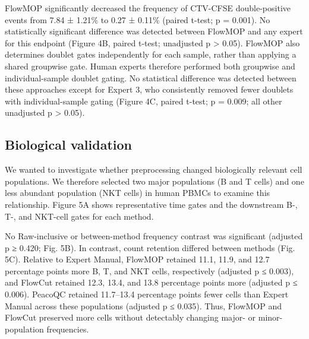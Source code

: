 \documentclass[ASNA]{latex/wiley/USG}
\begin{document}
FlowMOP significantly decreased the frequency of CTV-CFSE
double-positive events from 7.84 ± 1.21\% to 0.27 ± 0.11\% (paired
t-test; p = 0.001). No statistically significant difference was detected
between FlowMOP and any expert for this endpoint (Figure 4B, paired
t-test; unadjusted p \textgreater{} 0.05). FlowMOP also determines
doublet gates independently for each sample, rather than applying a
shared groupwise gate. Human experts therefore performed both groupwise
and individual-sample doublet gating. No statistical difference was
detected between these approaches except for Expert 3, who consistently
removed fewer doublets with individual-sample gating (Figure 4C, paired
t-test; p = 0.009; all other unadjusted p \textgreater{} 0.05).

\subsection{Biological validation}\label{biological-validation}

We wanted to investigate whether preprocessing changed biologically
relevant cell populations. We therefore selected two major populations
(B and T cells) and one less abundant population (NKT cells) in human
PBMCs to examine this relationship. Figure 5A shows representative time
gates and the downstream B-, T-, and NKT-cell gates for each method.

No Raw-inclusive or between-method frequency contrast was significant
(adjusted p ≥ 0.420; Fig. 5B). In contrast, count retention differed
between methods (Fig. 5C). Relative to Expert Manual, FlowMOP retained
11.1, 11.9, and 12.7 percentage points more B, T, and NKT cells,
respectively (adjusted p ≤ 0.003), and FlowCut retained 12.3, 13.4, and
13.8 percentage points more (adjusted p ≤ 0.006). PeacoQC retained
11.7--13.4 percentage points fewer cells than Expert Manual across these
populations (adjusted p ≤ 0.035). Thus, FlowMOP and FlowCut preserved
more cells without detectably changing major- or minor-population
frequencies.
\end{document}

